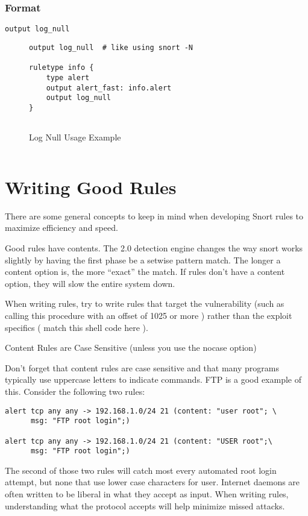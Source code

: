 \documentclass[english]{report}
\begin{document}
\subsubsection{Format}

\begin{verbatim}
output log_null
\end{verbatim}
%
\begin{figure}[!hbpt]
\begin{verbatim}
output log_null  # like using snort -N

ruletype info {
    type alert
    output alert_fast: info.alert
    output log_null
}


\end{verbatim}

\caption{Log Null Usage Example\label{log null usage example}}
\end{figure}


\begin{verbatim}

\end{verbatim}

\section{Writing Good Rules}

There are some general concepts to keep in mind when developing Snort
rules to maximize efficiency and speed.

Good rules have contents.  The 2.0 detection engine changes the way
snort works slightly by having the first phase be a setwise pattern
match.  The longer a content option is, the more ``exact'' the match.
If rules don't have a content option, they will slow the entire system
down.

When writing rules, try to write rules that target the vulnerability
(such as calling this procedure with an offset of 1025 or more )
rather than the exploit specifics ( match this shell code here ). 

Content Rules are Case Sensitive (unless you use the nocase
option)

Don't forget that content rules are case sensitive and that many programs
typically use uppercase letters to indicate commands. FTP is a good
example of this. Consider the following two rules:

\begin{verbatim}
alert tcp any any -> 192.168.1.0/24 21 (content: "user root"; \
      msg: "FTP root login";)

alert tcp any any -> 192.168.1.0/24 21 (content: "USER root";\
      msg: "FTP root login";)

\end{verbatim}
The second of those two rules will catch most every automated root
login attempt, but none that use lower case characters for user.
Internet daemons are often written to be liberal in what they accept
as input. When writing rules, understanding what the protocol accepts
will help minimize missed attacks.
\end{document}
